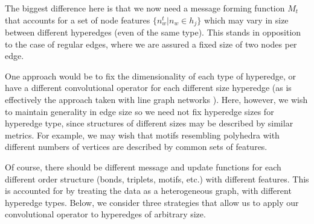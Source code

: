 \documentclass[twoside,twocolumn,9pt]{article}
\begin{document}

The biggest difference here is that we now need a message forming function $M_t$ that accounts for a set of node features $\lbrace n_w^t \vert n_w \in h_j \rbrace$ which may vary in size between different hyperedges (even of the same type). This stands in opposition to the case of regular edges, where we are assured a fixed size of two nodes per edge. 

One approach would be to fix the dimensionality of each type of hyperedge, or have a different convolutional operator for each different size hyperedge (as is effectively the approach taken with line graph networks \cite{linegraph_general}). Here, however, we wish to maintain generality in edge size so we need not fix hyperedge sizes for hyperedge type, since structures of different sizes may be described by similar metrics. For example, we may wish that motifs resembling polyhedra with different numbers of vertices are described by common sets of features.



Of course, there should be different message and update functions for each different order structure (bonds, triplets, motifs, etc.) with different features. This is accounted for by treating the data as a heterogeneous graph, with different hyperedge types. Below, we consider three strategies that allow us to apply our convolutional operator to hyperedges of arbitrary size.
\end{document}
